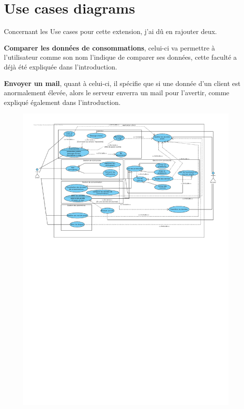 \section{Use cases diagrams}

\begin{flushleft}
Concernant les Use cases pour cette extension, j'ai dû en rajouter deux.
\end{flushleft}

\begin{flushleft}
\textbf{Comparer les données de consommations}, celui-ci va permettre à l'utilisateur comme son nom l'indique de comparer ses données, cette faculté a déjà été expliquée dans l'introduction.
\end{flushleft}

\begin{flushleft}
\textbf{Envoyer un mail}, quant à celui-ci, il spécifie que si une donnée d'un client est anormalement élevée, alors le serveur enverra un mail pour l'avertir, comme expliqué également dans l'introduction.
\end{flushleft}

\begin{figure}[h]
\centering
\includegraphics[width=1.3\textwidth]{extension-adrien/Use-case/img/use-case.pdf}
\end{figure}

